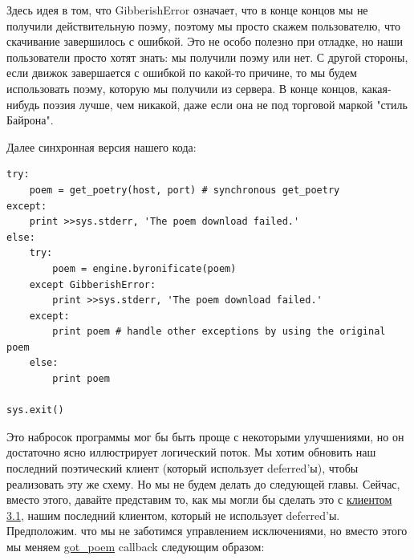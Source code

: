 Здесь идея в том, что GibberishError означает, что в конце концов 
мы не получили действительную поэму, поэтому мы просто скажем 
пользователю, что скачивание завершилось с ошибкой. Это не особо 
полезно при отладке, но наши пользователи просто хотят 
знать: мы получили поэму или нет. С другой стороны, если движок 
завершается с ошибкой по какой-то причине, то мы будем использовать 
поэму, которую мы получили из сервера. В конце концов, какая-нибудь 
поэзия лучше, чем никакой, даже если она не под торговой маркой "стиль Байрона". 


Далее синхронная версия нашего кода:


\begin{scriptsize}\begin{verbatim}
try:
    poem = get_poetry(host, port) # synchronous get_poetry
except:
    print >>sys.stderr, 'The poem download failed.'
else:
    try:
        poem = engine.byronificate(poem)
    except GibberishError:
        print >>sys.stderr, 'The poem download failed.'
    except:
        print poem # handle other exceptions by using the original poem
    else:
        print poem

sys.exit()
\end{verbatim}\end{scriptsize}



Это набросок программы мог бы быть проще с некоторыми улучшениями, но он 
достаточно ясно иллюстрирует логический поток. Мы хотим обновить наш 
последний поэтический клиент (который использует deferred'ы), чтобы 
реализовать эту же схему. Но мы не будем делать до следующей главы. 
Сейчас, вместо этого, давайте представим то, как мы могли бы сделать 
это с  
\href{http://github.com/jdavisp3/twisted-intro/blob/master/twisted-client-3/get-poetry-1.py}{клиентом 3.1},  
нашим последний клиентом, который не использует deferred'ы. Предположим. что мы 
не заботимся управлением исключениями, но вместо этого мы меняем 
\href{http://github.com/jdavisp3/twisted-intro/blob/master/twisted-client-3/get-poetry-1.py#L106}{got\_poem} 
callback следующим образом:


